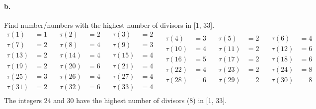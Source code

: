 \documentclass{article}
\begin{document}
	\paragraph{b. }Find number/numbers with the highest number of divisors in [1,
	33].
	\begin{equation*}
	\begin{split}
		\tau(1)&=1 \\
		\tau(7)&=2 \\
		\tau(13)&=2 \\
		\tau(19)&=2 \\
		\tau(25)&=3 \\
		\tau(31)&=2 \\
	\end{split}
	\quad
	\begin{split}
		\tau(2)&=2 \\
		\tau(8)&=4 \\
		\tau(14)&=4 \\
		\tau(20)&=6 \\
		\tau(26)&=4 \\
		\tau(32)&=6 \\
	\end{split}
	\quad
	\begin{split}
		\tau(3)&=2 \\
		\tau(9)&=3 \\
		\tau(15)&=4 \\
		\tau(21)&=4 \\
		\tau(27)&=4 \\
		\tau(33)&=4 \\
	\end{split}
	\quad
	\begin{split}
		\tau(4)&=3 \\
		\tau(10)&=4 \\
		\tau(16)&=5 \\
		\tau(22)&=4 \\
		\tau(28)&=6 \\\\
	\end{split}
	\quad
	\begin{split}
		\tau(5)&=2 \\
		\tau(11)&=2 \\
		\tau(17)&=2 \\
		\tau(23)&=2 \\
		\tau(29)&=2 \\\\
	\end{split}
	\quad
	\begin{split}
		\tau(6)&=4 \\
		\tau(12)&=6 \\
		\tau(18)&=6 \\
		\tau(24)&=8 \\
		\tau(30)&=8 \\\\
	\end{split}
	\end{equation*}
	The integers 24 and 30 have the highest number of divisors (8) in [1, 33].
\end{document}
